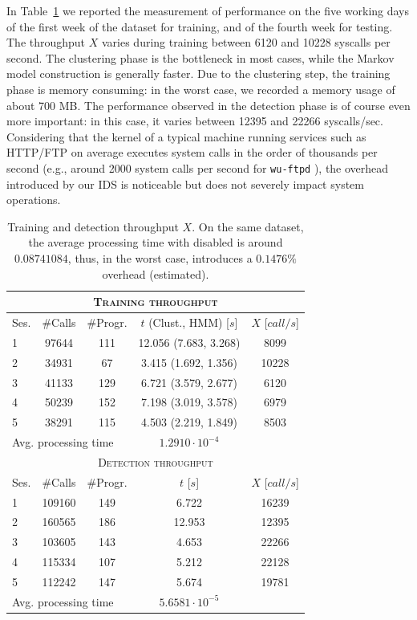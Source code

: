 In Table~\ref{tab:throughput} we reported the measurement of
performance on the five working days of the first week of the dataset
for training, and of the fourth week for testing. The throughput $X$
varies during training between 6120 and 10228 syscalls
per second. The clustering phase is the bottleneck in most cases,
while the Markov model construction is generally faster. Due to the
clustering step, the training phase is memory consuming: in the worst
case, we recorded a memory usage of about 700 MB. The performance
observed in the detection phase is of course even more important: in
this case, it varies between 12395 and 22266 syscalls/sec. Considering
that the kernel of a typical machine running services such as
\ac{HTTP}/F\ac{TP} on average executes system
calls in the order of thousands per second (e.g., around 2000 system
calls per second for \texttt{wu-ftpd} \citep{mutz06:syscalls}), the
overhead introduced by our \ac{IDS} is noticeable but does
not severely impact system operations.

\begin{table}[p]
  \centering
  \begin{tabular}{lcccc}
    \toprule
    \multicolumn{5}{c}{\scshape Training throughput}\\
    \midrule
    Ses. & \#Calls & \#Progr. & $t$ (Clust., HMM) [$s$] & $X$ [$call/s$]\\
    \midrule
    1 & 97644 & 111 & 12.056 (7.683, 3.268) & 8099\\ 
    2 & 34931 & 67 & 3.415 (1.692, 1.356) & 10228\\ 
    3 & 41133 & 129 & 6.721 (3.579, 2.677) & 6120\\ 
    4 & 50239 & 152 & 7.198 (3.019, 3.578) & 6979\\ 
    5 & 38291 & 115 & 4.503 (2.219, 1.849) & 8503\\ 
    \midrule
    \multicolumn{3}{l}{Avg. processing time} & $1.2910 \cdot 10^{-4}$ &\\
    \midrule
    \multicolumn{5}{c}{\scshape Detection throughput}\\
    \midrule
    Ses. & \#Calls & \#Progr. & $t$ [$s$] & $X$ [$call/s$]\\
    \midrule
    1 & 109160 & 149 & 6.722 & 16239\\ 
    2 & 160565 & 186 & 12.953 & 12395\\ 
    3 & 103605 & 143 & 4.653 & 22266\\ 
    4 & 115334 & 107 & 5.212 & 22128\\ 
    5 & 112242 & 147 & 5.674 & 19781\\ 
    \midrule
    \multicolumn{3}{l}{Avg. processing time} & $5.6581 \cdot 10^{-5}$ &\\
  \end{tabular}
  
  \caption{Training and detection throughput $X$. On the same dataset,
    the average processing time with \SSAADE disabled is around
    $0.08741084$, thus, in the worst case, \SSAADE introduces a
    $0.1476\%$ overhead (estimated).}
  \label{tab:throughput}
\end{table}

